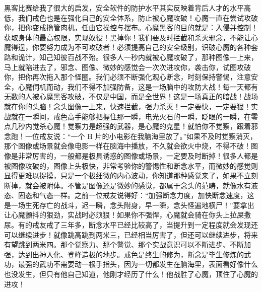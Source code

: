 黑客比赛给我了很大的启发，安全软件的防护水平其实反映着背后人才的水平高低，我们戒色也是在强化自己的安全体系，防止被心魔攻破！心魔一直在尝试攻破你，把你变成撸管肉机，任由它操控与摆布。心魔黑客的目的就是：入侵并控制！获取身体的最高权限，实现奴役！黑掉你！我们要及时拦截和杀灭邪念，不能让心魔得逞，你要努力成为不可攻破者！必须提高自己的安全级别，识破心魔的各种套路和诡计，知己知彼百战不殆。很多人一秒内就被心魔攻破了，那种图像一上来，马上就陷进去了，邪念、图像、微妙的感觉会一次次进攻你，袭击你，试图攻破你，把你再次拖入那个怪圈。我们必须不断强化观心断念，时刻保持警惕，注意安全，心魔伺机而动，我们不得不加强防备，这是一场脑中的攻防大战！每一天都有无数的人被心魔黑客攻破，不仅是中国，而是全世界！这是一场真正的暗战！战场就在你的头脑！念头图像一上来，快速拦截，强力杀灭！一定要快，一定要狠！实战就在一瞬间，戒色高手能够把握住那一瞬，电光火石的一瞬，眨眼的一瞬，在零点几秒内觉杀心魔！觉察力是超强的武器，是心魔的克星！就怕你不觉察，跟着邪念跑！一位戒友说：“一个 H 片的小电影在我脑海里放了。”如果不及时觉察消灭，那个图像或场景就会像电影一样在脑海中播放，不久就会欲火中烧，不得不破！图像是非常厉害的，一般都是极具诱惑的图像或场景，一定要及时断掉！很多人都是被图像攻破的，图像上头极快，非常考验你的警惕性和断念水平，而微妙的感觉则显得更难以捉摸，只是一个极细微的内心波动，你知道那种感觉来了，如果不立刻断掉，就会被附体。不管是图像还是微妙的感觉，都属于念头的范畴，就像水有液态、固态和气态一样。之前一位戒友说得好：“加强断念力度，加快断念速度，这是一场生死存亡的战斗，迟一瞬，念头附身，早一瞬，念头怪遍地横尸！”要拿出让心魔颤抖的狠劲，实战时必须狠！如果你不强悍，心魔就会骑在你头上拉屎撒尿。有的戒友戒了三年多，断念水平已经比较高了，当提升到一定程度就会发现还可以继续进步！就像跳高跳到两米三，已经相当厉害了，但还可以继续进步，将来有望跳到两米四。那个觉察力、那个警觉、那个实战意识可以不断进步、不断加强，达到出神入化、登峰造极的地步。戒色是终生的修为，断念是毕生修炼的武功，最强的武功不需要动一根手指头，因为一切都发生在脑海里，表面看好像什么也没发生，但只有他自己知道，他刚才经历了什么！他战胜了心魔，顶住了心魔的进攻！

